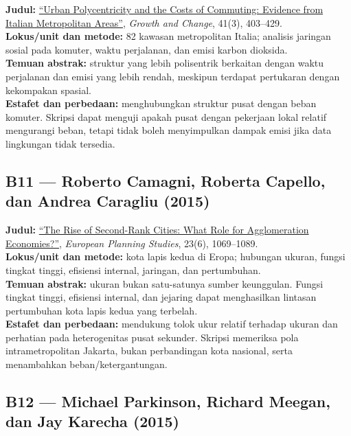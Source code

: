 \documentclass[
  indonesian,
  11pt,
  a4paper,
  oneside,
  openany]{report}
\begin{document}
\textbf{Judul:}
\href{https://doi.org/10.1111/j.1468-2257.2010.00531.x}{``Urban
Polycentricity and the Costs of Commuting: Evidence from Italian
Metropolitan Areas''}, \emph{Growth and Change}, 41(3), 403--429.\\
\textbf{Lokus/unit dan metode:} 82 kawasan metropolitan Italia; analisis
jaringan sosial pada komuter, waktu perjalanan, dan emisi karbon
dioksida.\\
\textbf{Temuan abstrak:} struktur yang lebih polisentrik berkaitan
dengan waktu perjalanan dan emisi yang lebih rendah, meskipun terdapat
pertukaran dengan kekompakan spasial.\\
\textbf{Estafet dan perbedaan:} menghubungkan struktur pusat dengan
beban komuter. Skripsi dapat menguji apakah pusat dengan pekerjaan lokal
relatif mengurangi beban, tetapi tidak boleh menyimpulkan dampak emisi
jika data lingkungan tidak tersedia.

\subsection{B11 --- Roberto Camagni, Roberta Capello, dan Andrea
Caragliu
(2015)}\label{b11-roberto-camagni-roberta-capello-dan-andrea-caragliu-2015}

\textbf{Judul:}
\href{https://doi.org/10.1080/09654313.2014.904999}{``The Rise of
Second-Rank Cities: What Role for Agglomeration Economies?''},
\emph{European Planning Studies}, 23(6), 1069--1089.\\
\textbf{Lokus/unit dan metode:} kota lapis kedua di Eropa; hubungan
ukuran, fungsi tingkat tinggi, efisiensi internal, jaringan, dan
pertumbuhan.\\
\textbf{Temuan abstrak:} ukuran bukan satu-satunya sumber keunggulan.
Fungsi tingkat tinggi, efisiensi internal, dan jejaring dapat
menghasilkan lintasan pertumbuhan kota lapis kedua yang terbelah.\\
\textbf{Estafet dan perbedaan:} mendukung tolok ukur relatif terhadap
ukuran dan perhatian pada heterogenitas pusat sekunder. Skripsi
memeriksa pola intrametropolitan Jakarta, bukan perbandingan kota
nasional, serta menambahkan beban/ketergantungan.

\subsection{B12 --- Michael Parkinson, Richard Meegan, dan Jay Karecha
(2015)}\label{b12-michael-parkinson-richard-meegan-dan-jay-karecha-2015}
\end{document}
